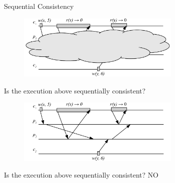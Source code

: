 \begin{frame}{Sequential Consistency}

\begin{overprint}

\begin{figure}
\includegraphics[width=0.7\textwidth]{seq-03}
\end{figure}

\begin{example}

\BIL
\item Is the execution above sequentially consistent? 
\EIL

\end{example}

\begin{figure}
\includegraphics[width=0.7\textwidth]{seq-03n}
\end{figure}

\begin{example}

\BIL
\item Is the execution above sequentially consistent? NO
\EIL

\end{example}

\end{overprint}

\end{frame}

